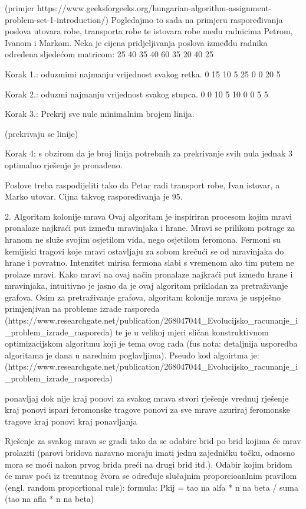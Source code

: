 (primjer https://www.geeksforgeeks.org/hungarian-algorithm-assignment-problem-set-1-introduction/)
Pogledajmo to sada na primjeru raspoređivanja poslova utovara robe, transporta robe te istovara robe među radnicima Petrom, Ivanom i Markom.
Neka je cijena pridjeljivanja poslova izmeđdu radnika određena sljedećom matricom:
25 40 35
40 60 35
20 40 25

Korak 1.: oduzmimi najmanju vrijednost svakog retka.
0 15 10
5 25 0
0 20 5

Korak 2.: oduzmi najmanju vrijednost svakog stupca.
0 0  10
5 10 0
0 5  5

Korak 3.: Prekrij sve nule minimalnim brojem linija.

(prekrivaju se linije)


Korak 4: s obzirom da je broj linija potrebnih za prekrivanje svih nula jednak 3 optimalno rješenje je pronađeno.

Poslove treba raspodijeliti tako da Petar radi transport robe, Ivan istovar, a Marko utovar. Cijna takvog raspoređivanja je 95.





2. Algoritam kolonije mrava
Ovaj algoritam je inspiriran procesom kojim mravi pronalaze najkraći put između mravinjaka i hrane. Mravi se prilikom potrage za hranom ne
služe svojim osjetilom vida, nego osjetilom feromona. Fermoni su kemijiski tragovi koje mravi ostavljaju za sobom krečući se od
mravinjaka do hrane i povratno. Intenzitet mirisa fermona slabi s vremenom ako tim putem ne prolaze mravi. Kako mravi na ovaj način pronalaze
najkraći put između hrane i mravinjaka, intuitivno je jasno da je ovaj algoritam prikladan za pretraživanje grafova. Osim za pretraživanje grafova,
algoritam kolonije mrava je uspješno primjenjivan na probleme izrade rasporeda (https://www.researchgate.net/publication/268047044_Evolucijsko_racunanje_i_problem_izrade_rasporeda)
te je u velikoj mjeri sličan konstruktivnom optimizacijskom algoritmu koji je tema ovog rada (fus nota: detaljnija usporedba algoritama je dana u narednim poglavljima).
Pseudo kod algoirtma je: (https://www.researchgate.net/publication/268047044_Evolucijsko_racunanje_i_problem_izrade_rasporeda)

ponavljaj dok nije kraj
  ponovi za svakog mrava
    stvori rješenje
    vrednuj rješenje
  kraj ponovi
  ispari feromonske tragove
  ponovi za sve mrave
      azuriraj feromonske tragove
  kraj ponovi
kraj ponavljanja


Rješenje za svakog mrava se gradi tako da se odabire brid po brid kojima će mrav prolaziti (parovi bridova naravno moraju imati jednu
zajedničku točku, odnosno mora se moći nakon prvog brida preći na drugi brid itd.). Odabir kojim bridom će mrav poći iz trenutnog čvora
se određuje slučajnim proporcioanlnim pravilom (engl. random proportional rule):
formula: Pkij = tao na alfa * n na beta / suma (tao na afla * n na beta)

